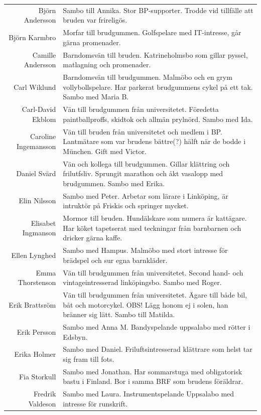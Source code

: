 \documentclass[a5paper]{article}
\begin{document}
\begin{longtable}[l]{N|L}
				Björn Andersson	&	Sambo till Annika. Stor BP-supporter. Trodde vid tillfälle att bruden var frireligös.	\\
				Björn Karmbro	&	Morfar till brudgummen. Golfspelare med IT-intresse, går gärna promenader.  	\\
				Camille Andersson	&	Barndomsvän till bruden. Katrineholmsbo som gillar pyssel, matlagning och promenader.	\\
				Carl Wiklund	&	Barndomsvän till brudgummen. Malmöbo och en grym vollybollspelare. Har parkerat brudgummens cykel på ett tak. Sambo med Maria B.	\\
				Carl-David Ekblom	&	Vän till brudgummen från universitetet. Föredetta paintballproffs, skidtok och allmän prylnörd. Sambo med Ida.	\\
				Caroline Ingemansson &	Vän till bruden från universitetet och medlem i BP. Lantmätare som var brudens bättre(?) hälft när de bodde i München. Gift med Victor.	\\
				Daniel Svärd	&	Vän och kollega till brudgummen. Gillar klättring och frilutfsliv. Sprungit marathon och åkt vasalopp med brudgummen.  Sambo med Erika.	\\
				Elin Nilsson	&	Sambo med Peter. Arbetar som lärare i Linköping, är intruktör på Friskis och springer mycket.	\\
				Elisabet Ingmanson	&	Mormor till bruden. Hundälskare som numera är kattägare. Har köket tapetserat med teckningar från barnbarnen och dricker gärna kaffe.	\\
				Ellen Lynghed	&	Sambo med Hampus. Malmöbo med stort intresse för brädspel och sur egna barnkläder.	\\
				Emma Thorstenson	&	Vän till brudgummen från universitetet. Second hand- och vintageintresserad linköpingsbo. Sambo med Roger.	\\
				Erik Brattsröm	&	Vän till brudgummen från universitetet. Ägare till både bil, båt och motorcykel. OBS! Lägg honom ej i solen, han bränner sig lätt. Sambo till Matilda.	\\
				Erik Persson	&	Sambo med Anna M. Bandyspelande uppsalabo med rötter i Edsbyn. 	\\
				Erika Holmer	&	Sambo med Daniel. Friluftsintresserad klättrare som helst tar sig fram till fots.	\\
				Fia Storkull	&	Sambo med Jonathan.  Har sommarstuga med obligatorisk bastu i Finland. Bor i samma BRF som brudens föräldrar.	\\
				Fredrik Valdeson	& Sambo med Laura. Instrumentspelande Uppsalabo med intresse för runskrift.	\\

\end{longtable}
\end{document}
